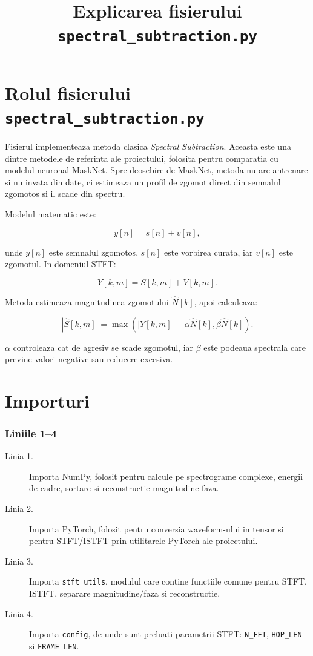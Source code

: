 \documentclass[12pt,a4paper]{report}
\title{Explicarea fisierului \texttt{spectral\_subtraction.py}}
\author{}
\date{}
\newcommand{\codechunk}[2]{%
\subsection*{Liniile #1--#2}

}
\begin{document}
\maketitle
\tableofcontents
\clearpage

\chapter{Rolul fisierului \texttt{spectral\_subtraction.py}}

Fisierul  implementeaza metoda clasica
\textit{Spectral Subtraction}. Aceasta este una dintre metodele de referinta ale
proiectului, folosita pentru comparatia cu modelul neuronal MaskNet. Spre deosebire
de MaskNet, metoda nu are antrenare si nu invata din date, ci estimeaza un profil
de zgomot direct din semnalul zgomotos si il scade din spectru.

Modelul matematic este:

\[
y[n] = s[n] + v[n],
\]

unde \(y[n]\) este semnalul zgomotos, \(s[n]\) este vorbirea curata, iar \(v[n]\)
este zgomotul. In domeniul STFT:

\[
Y[k,m] = S[k,m] + V[k,m].
\]

Metoda estimeaza magnitudinea zgomotului \(\hat{N}[k]\), apoi calculeaza:

\[
|\hat{S}[k,m]| =
\max\left(|Y[k,m]| - \alpha\hat{N}[k], \beta\hat{N}[k]\right).
\]

\(\alpha\) controleaza cat de agresiv se scade zgomotul, iar \(\beta\) este
podeaua spectrala care previne valori negative sau reducere excesiva.

\chapter{Importuri}

\codechunk{1}{4}

\begin{description}
    \item[Linia 1.] Importa NumPy, folosit pentru calcule pe spectrograme complexe,
    energii de cadre, sortare si reconstructie magnitudine-faza.

    \item[Linia 2.] Importa PyTorch, folosit pentru conversia waveform-ului in tensor
    si pentru STFT/ISTFT prin utilitarele PyTorch ale proiectului.

    \item[Linia 3.] Importa \texttt{stft\_utils}, modulul care contine functiile
    comune pentru STFT, ISTFT, separare magnitudine/faza si reconstructie.

    \item[Linia 4.] Importa \texttt{config}, de unde sunt preluati parametrii STFT:
    \texttt{N\_FFT}, \texttt{HOP\_LEN} si \texttt{FRAME\_LEN}.
\end{description}
\end{document}
